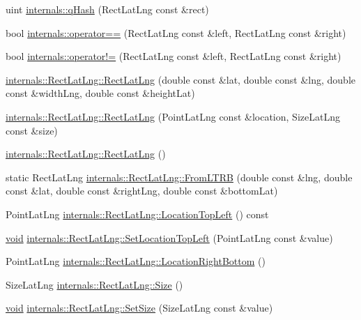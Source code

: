 \begin{DoxyCompactItemize}
uint \hyperlink{group___o_p_map_widget_gaa7f2cebba412ed2292d9e59299b7fd07}{internals\-::q\-Hash} (\-Rect\-Lat\-Lng const \&rect)
\item 
bool \hyperlink{group___o_p_map_widget_gae075f9b2f8b993dfd37de8f38ef1b72b}{internals\-::operator==} (\-Rect\-Lat\-Lng const \&left, \-Rect\-Lat\-Lng const \&right)
\item 
bool \hyperlink{group___o_p_map_widget_ga8957984d0dfe65bb3042d9fd7f36f043}{internals\-::operator!=} (\-Rect\-Lat\-Lng const \&left, \-Rect\-Lat\-Lng const \&right)
\item 
\hyperlink{group___o_p_map_widget_ga4ae20976d028402ff59ecd45b52214be}{internals\-::\-Rect\-Lat\-Lng\-::\-Rect\-Lat\-Lng} (double const \&lat, double const \&lng, double const \&width\-Lng, double const \&height\-Lat)
\item 
\hyperlink{group___o_p_map_widget_gab62bfb97bab6213f9a6159d2f1c75d5d}{internals\-::\-Rect\-Lat\-Lng\-::\-Rect\-Lat\-Lng} (\-Point\-Lat\-Lng const \&location, \-Size\-Lat\-Lng const \&size)
\item 
\hyperlink{group___o_p_map_widget_ga512c376dfebb298e064a143c262ac18f}{internals\-::\-Rect\-Lat\-Lng\-::\-Rect\-Lat\-Lng} ()
\item 
static \-Rect\-Lat\-Lng \hyperlink{group___o_p_map_widget_gaaf71d43bd87065c51a98a46717d581a6}{internals\-::\-Rect\-Lat\-Lng\-::\-From\-L\-T\-R\-B} (double const \&lng, double const \&lat, double const \&right\-Lng, double const \&bottom\-Lat)
\item 
\-Point\-Lat\-Lng \hyperlink{group___o_p_map_widget_gaed234223ec4033a1e269d271d032c9fa}{internals\-::\-Rect\-Lat\-Lng\-::\-Location\-Top\-Left} () const 
\item 
\hyperlink{group___u_a_v_objects_plugin_ga444cf2ff3f0ecbe028adce838d373f5c}{void} \hyperlink{group___o_p_map_widget_gabe9e8daac2f01196b738c5590fe23b94}{internals\-::\-Rect\-Lat\-Lng\-::\-Set\-Location\-Top\-Left} (\-Point\-Lat\-Lng const \&value)
\item 
\-Point\-Lat\-Lng \hyperlink{group___o_p_map_widget_gaa5faf64c8706dfbe274d2265f0d017ae}{internals\-::\-Rect\-Lat\-Lng\-::\-Location\-Right\-Bottom} ()
\item 
\-Size\-Lat\-Lng \hyperlink{group___o_p_map_widget_ga9e982e2f84c0c4faf6fb0a09d57dc18b}{internals\-::\-Rect\-Lat\-Lng\-::\-Size} ()
\item 
\hyperlink{group___u_a_v_objects_plugin_ga444cf2ff3f0ecbe028adce838d373f5c}{void} \hyperlink{group___o_p_map_widget_ga00d3530356a06affd5c53a39b5247030}{internals\-::\-Rect\-Lat\-Lng\-::\-Set\-Size} (\-Size\-Lat\-Lng const \&value)

\end{DoxyCompactItemize}

